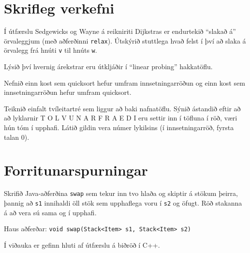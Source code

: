 \documentclass[addpoints]{exam}
\begin{document}
\begin{questions}
	\section{Skrifleg verkefni}

	\question[5]

	Í útfærslu Sedgewicks og Wayne á reikniriti Dijkstras er endurtekið ``slakað á'' örvaleggjum (með aðferðinni \texttt{relax}). Útskýrið stuttlega hvað felst í því að slaka á örvalegg frá hnúti \texttt{v} til hnúts \texttt{w}.


	\newpage

	\question[5]

	Lýsið því hvernig árekstrar eru útkljáðir í “linear probing” hakkatöflu.


	\question[5]

	Nefnið einn kost sem quicksort hefur umfram innsetningarröðun og einn kost sem innsetningarröðun hefur umfram quicksort.


	\newpage

	\question[5]

	Teiknið einfalt tvíleitartré sem liggur að baki nafnatöflu. Sýnið ástandið eftir að að lyklarnir T O L V U N A R F R A E D I eru settir inn í töfluna í röð, væri hún tóm í upphafi. Látið gildin vera númer lykilsins (í innsetningarröð, fyrsta talan 0).


	\newpage

	\section{Forritunarspurningar}

	\question[10] Skrifið Java-aðferðina \texttt{swap} sem tekur inn tvo hlaða og skiptir á stökum þeirra, þannig að \texttt{s1} innihaldi öll stök sem upphaflega voru í \texttt{s2} og öfugt. Röð stakanna á að vera sú sama og í upphafi.

	Haus aðferðar: \texttt{void swap(Stack<Item> s1, Stack<Item> s2)}


	\newpage

	\question

	Í viðauka er gefinn hluti af útfærslu á biðröð í C++.


\end{questions}
\end{document}
